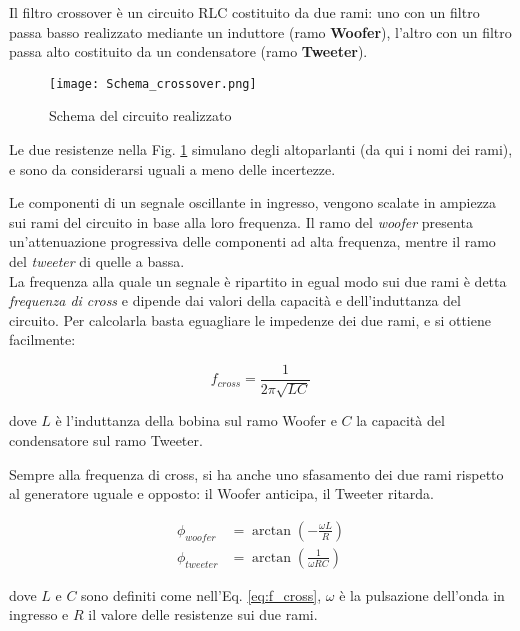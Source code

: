 \documentclass[../Relazione_circuiti]{subfiles}
\begin{document}
Il filtro crossover è un circuito RLC costituito da due rami: uno con un filtro passa basso realizzato mediante un
induttore (ramo \textbf{Woofer}), l'altro con un filtro passa alto costituito da un condensatore (ramo
\textbf{Tweeter}).

\begin{figure}[H]
  \centering
  \texttt{[image: Schema\_crossover.png]}

  \caption{Schema del circuito realizzato}
  \label{fig:schema_circuito}

\end{figure}

Le due resistenze nella Fig. \ref{fig:schema_circuito} simulano degli altoparlanti (da qui i nomi dei rami), e sono da
considerarsi uguali a meno delle incertezze.

Le componenti di un segnale oscillante in ingresso, vengono scalate in ampiezza sui rami del circuito in base alla loro
frequenza. Il ramo del \textit{woofer} presenta un'attenuazione progressiva delle componenti ad alta frequenza, mentre il ramo
del \textit{tweeter} di quelle a bassa.\\
La frequenza alla quale un segnale è ripartito in egual modo sui due rami è detta \textit{frequenza di cross} e dipende
dai valori della capacità e dell'induttanza del circuito.
Per calcolarla basta eguagliare le impedenze dei due rami, e si ottiene facilmente:

\begin{equation}
  \label{eq:f_cross}
  f_{cross} = \frac{1}{2 \pi \sqrt{LC} }
\end{equation}

dove $L$ è l'induttanza della bobina sul ramo Woofer e $C$ la capacità del condensatore sul ramo Tweeter.

Sempre alla frequenza di cross, si ha anche uno sfasamento dei due rami rispetto al generatore uguale e opposto: il
Woofer anticipa, il Tweeter ritarda.

\begin{align}
  \phi_{woofer} &= \arctan(-\frac{\omega L}{R}) \label{eq:p_woofer} \\
  \phi_{tweeter} &= \arctan(\frac{1}{\omega RC}) \label{eq:p_tweeter}
\end{align}

dove $L$ e $C$ sono definiti come nell'Eq. \eqref{eq:f_cross}, $\omega$ è la pulsazione dell'onda in ingresso e $R$ il
valore delle resistenze sui due rami.
\end{document}
